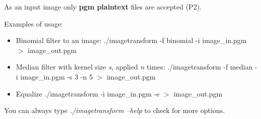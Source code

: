 \documentclass{article}
\begin{document}
	As an input image only {\bf pgm plaintext} files are accepted (P2). 

	Examples of usage:

	\begin{itemize}
		\item Binomial filter to an image:
		\subitem ./imagetransform -f binomial -i image\_in.pgm $>$ image\_out.pgm
		\item Median filter with kernel size {\it s}, applied {\it n} times:
		\subitem ./imagetransform -f median -i image\_in.pgm -s 3 -n 5 $>$ image\_out.pgm
		\item Equalize
		\subitem ./imagetransform -i image\_in.pgm -e $>$ image\_out.pgm
	\end{itemize}

	You can always type {\it ./imagetransform --help} to check for more options. 
\end{document}

